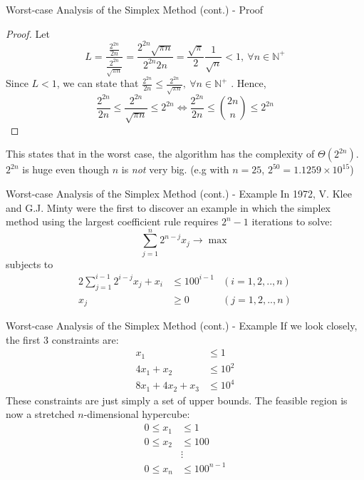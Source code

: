 \documentclass[10pt]{beamer}
\begin{document}
\begin{frame}{Worst-case Analysis of the Simplex Method (cont.) - Proof}
\begin{proof}
Let
$$
\displaystyle
L = \frac{\frac{2^{2n}}{2n}}{\frac{2^{2n}}{\sqrt{\pi n}}} = \frac{2^{2n}\sqrt{\pi n}}{2^{2n} 2n} = \frac{\sqrt{\pi}}{2} \frac{1}{\sqrt{n}} < 1,\ \forall n \in \mathbb{N^+}
$$
Since $L < 1$, we can state that $\frac{2^{2n}}{2n} \leq \frac{2^{2n}}{\sqrt{\pi n}},\ \forall n \in \mathbb{N^+}
$
. Hence,
$$
\displaystyle
\frac{2^{2n}}{2n} \leq \frac{2^{2n}}{\sqrt{\pi n}} \leq 2^{2n} \iff \frac{2^{2n}}{2n} \leq {2n \choose n} \leq 2^{2n}
$$
\end{proof}
This states that in the worst case, the algorithm has the complexity of $\Theta(2^{2n})$. $2^{2n}$ is huge even though $n$ is \textit{not} very big. (e.g with $n = 25$, $2^{50} = 1.1259\times 10^{15}$)
\end{frame}

\begin{frame}{Worst-case Analysis of the Simplex Method (cont.) - Example}
In 1972, V. Klee and G.J. Minty\cite{klee1970good} were the first to discover an example in which the
simplex method using the largest coefficient rule requires $2^n - 1$ iterations to solve:
\begin{equation*}
\sum_{j = 1}^{n} 2^{n - j} x_j \rightarrow \max
\end{equation*}
subjects to
\begin{equation*}
\begin{aligned}
2\sum_{j = 1}^{i - 1} 2^{i - j}x_j + x_i &\leq 100^{i - 1} & (i = 1, 2, .., n)\\
x_j &\geq 0 & (j = 1, 2, .., n)
\end{aligned}
\end{equation*}
\end{frame}

\begin{frame}{Worst-case Analysis of the Simplex Method (cont.) - Example}
If we look closely, the first 3 constraints are:
\begin{equation*}
\begin{aligned}
x_1 &\leq 1\\
4x_1 + x_2 &\leq 10^2\\
8x_1 + 4x_2 + x_3 &\leq 10^4
\end{aligned}
\end{equation*}
These constraints are just simply a set of upper bounds. The feasible region is now a stretched $n$-dimensional hypercube:
\begin{equation*}
\begin{aligned}
0 \leq x_1 &\leq 1\\
0 \leq x_2 &\leq 100\\
&\vdots\\
0 \leq x_n &\leq 100^{n - 1}
\end{aligned}
\end{equation*}
\end{frame}
\end{document}
